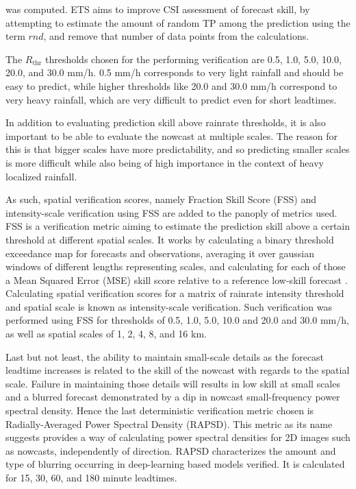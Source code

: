 was computed. ETS aims to improve CSI assessment of forecast skill, by attempting to estimate the amount of random TP among the prediction using the term $rnd$, and remove that number of data points from the calculations.

The $R_{\text{thr}}$ thresholds chosen for the performing verification are 0.5, 1.0, 5.0, 10.0, 20.0, and 30.0 mm/h. 0.5 mm/h corresponds to very light rainfall and should be easy to predict, while higher thresholds like 20.0 and 30.0 mm/h correspond to very heavy rainfall, which are very difficult to predict even for short leadtimes.

In addition to evaluating prediction skill above rainrate thresholds, it is also important to be able to evaluate the nowcast at multiple scales. The reason for this is that bigger scales have more predictability, and so predicting smaller scales is more difficult while also being of high importance in the context of heavy localized rainfall. 


As such, spatial verification scores, namely Fraction Skill Score (FSS) and intensity-scale verification using FSS are added to the panoply of metrics used. FSS is a verification metric aiming to estimate the prediction skill above a certain threshold at different spatial scales. It works by calculating a binary threshold exceedance map for forecasts and observations, averaging it over gaussian windows of different lengths representing scales, and calculating for each of those a Mean Squared Error (MSE) skill score relative to a reference low-skill forecast \cite{roberts_scale-selective_2008}. Calculating spatial verification scores for a matrix of rainrate intensity threshold and spatial scale is known as intensity-scale verification. Such verification was performed using FSS for thresholds of 0.5, 1.0, 5.0, 10.0 and 20.0 and 30.0 mm/h, as well as spatial scales of 1, 2, 4, 8, and 16 km. 

Last but not least, the ability to maintain small-scale details as the forecast leadtime increases is related to the skill of the nowcast with regards to the spatial scale. Failure in maintaining those details will results in low skill at small scales and a blurred forecast demonstrated by a dip in nowcast small-frequency power spectral density. Hence the last deterministic verification metric chosen is Radially-Averaged Power Spectral Density (RAPSD). This metric as its name suggests provides a way of calculating power spectral densities for 2D images such as nowcasts, independently of direction. RAPSD characterizes the amount and type of blurring occurring in deep-learning based models verified. It is calculated for 15, 30, 60, and 180 minute leadtimes.
 
